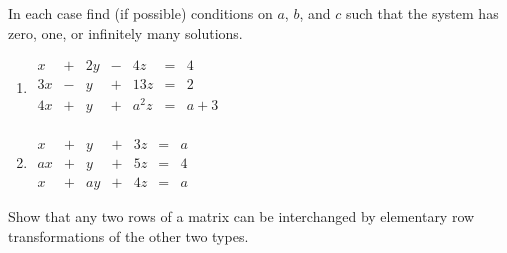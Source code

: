 \documentclass{ximera}
\begin{document}
\begin{problem}\label{prb:no._sol}
In each case find (if possible) conditions on $a$, $b$, and $c$ such that the system has zero, one, or infinitely many solutions.
\begin{enumerate}
\item

$\begin{array}{rlrlrcr}
	  x & + &  2y & - &  4z & = &  4 \\
	 3x & - &   y & + & 13z & = &  2 \\
	 4x & + &   y & + & a^2z & = & a + 3 \\
\end{array}$

\item

$\begin{array}{rlrlrcr}
	  x & + &   y & + &  3z & = &  a \\
	 ax & + &   y & + &  5z & = &  4 \\
	  x & + &  ay & + &  4z & = &  a
\end{array}$
\end{enumerate}
\end{problem}

\begin{problem}\label{prb:elementaryrowops}
Show that any two rows of a matrix can be interchanged by elementary row transformations of the other two types.

\end{problem}
\end{document}
